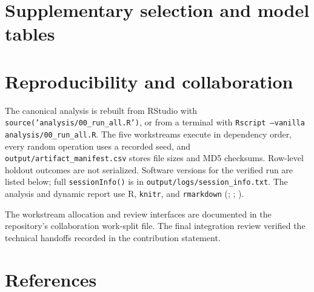 \documentclass[
  10pt,
]{article}
\newcommand{\tightinputtable}[1]{%
  \begingroup\small\setlength{\tabcolsep}{4pt}\endgroup%
}
\begin{document}
\section{Supplementary selection and model
tables}\label{supplementary-selection-and-model-tables}

\begingroup\scriptsize\setlength{\tabcolsep}{2.5pt}

\endgroup

\begingroup\scriptsize\setlength{\tabcolsep}{2.5pt}

\endgroup

\tightinputtable{../output/tables/tab_p4_enet_alpha_search.tex}

\tightinputtable{../output/tables/tab_p5_error_by_quality.tex}

\section{Reproducibility and
collaboration}\label{reproducibility-and-collaboration}

The canonical analysis is rebuilt from RStudio with
\texttt{source('analysis/00\_run\_all.R')}, or from a terminal with
\texttt{Rscript --vanilla analysis/00\_run\_all.R}. The five
workstreams execute in dependency order, every random operation uses a
recorded seed, and \texttt{output/artifact\_manifest.csv} stores file
sizes and MD5 checksums. Row-level holdout outcomes are not serialized.
Software versions for the verified run are listed below; full
\texttt{sessionInfo()} is in \texttt{output/logs/session\_info.txt}. The
analysis and dynamic report use R, \texttt{knitr}, and
\texttt{rmarkdown} (;
;
).

\tightinputtable{../output/tables/tab_reproducibility_versions.tex}

The workstream allocation and review interfaces are documented in the
repository's collaboration work-split file. The final integration review
verified the technical handoffs recorded in the contribution statement.

\newpage

\section*{References}\label{references}
\end{document}
